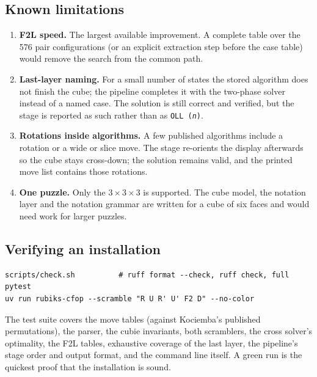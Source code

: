 \subsection{Known limitations}

\begin{enumerate}[leftmargin=1.4em]
  \item \textbf{F2L speed.}  The largest available improvement.  A complete table
  over the 576 pair configurations (or an explicit extraction step before the case
  table) would remove the search from the common path.
  \item \textbf{Last-layer naming.}  For a small number of states the stored
  algorithm does not finish the cube; the pipeline completes it with the two-phase
  solver instead of a named case.  The solution is still correct and verified, but
  the stage is reported as such rather than as \texttt{OLL (\textit{n})}.
  \item \textbf{Rotations inside algorithms.}  A few published algorithms include a
  rotation or a wide or slice move.  The stage re-orients the display afterwards so
  the cube stays cross-down; the solution remains valid, and the printed move list
  contains those rotations.
  \item \textbf{One puzzle.}  Only the $3\times3\times3$ is supported.  The cube
  model, the notation layer and the notation grammar are written for a cube of six
  faces and would need work for larger puzzles.
\end{enumerate}

\subsection{Verifying an installation}

\begin{lstlisting}[style=shell]
scripts/check.sh          # ruff format --check, ruff check, full pytest
uv run rubiks-cfop --scramble "R U R' U' F2 D" --no-color
\end{lstlisting}

The test suite covers the move tables (against Kociemba's published permutations),
the parser, the cubie invariants, both scramblers, the cross solver's optimality,
the F2L tables, exhaustive coverage of the last layer, the pipeline's stage order
and output format, and the command line itself.  A green run is the quickest proof
that the installation is sound.
